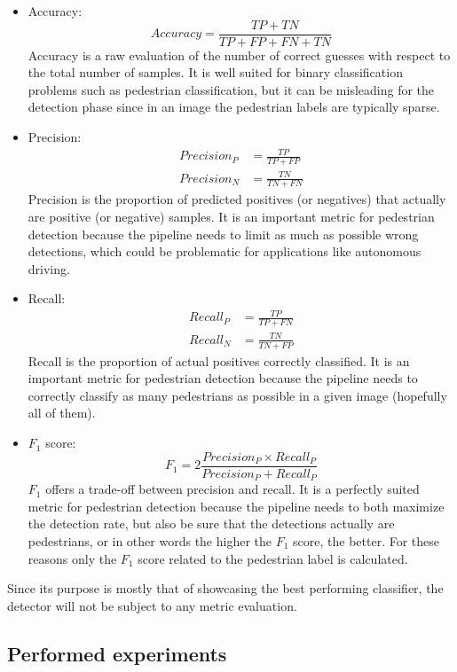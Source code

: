 \documentclass[journal,twocolumn]{IEEEtran}
\begin{document}
\begin{itemize}
\item Accuracy:
\begin{equation*}
Accuracy=\frac{TP+TN}{TP+FP+FN+TN}
\end{equation*}
Accuracy is a raw evaluation of the number of correct guesses with respect to the total number of samples. It is well suited for binary classification problems such as pedestrian classification, but it can be misleading for the detection phase since in an image the pedestrian labels are typically sparse.
\item Precision:
\begin{align*}
Precision_P &= \frac{TP}{TP+FP}\\
Precision_N &= \frac{TN}{TN+FN}
\end{align*}
Precision is the proportion of predicted positives (or negatives) that actually are positive (or negative) samples. It is an important metric for pedestrian detection because the pipeline needs to limit as much as possible wrong detections, which could be problematic for applications like autonomous driving.
\item Recall:
\begin{align*}
Recall_P &= \frac{TP}{TP+FN}\\
Recall_N &= \frac{TN}{TN+FP}
\end{align*}
Recall is the proportion of actual positives correctly classified. It is an important metric for pedestrian detection because the pipeline needs to correctly classify as many pedestrians as possible in a given image (hopefully all of them).
\item $F_1$ score:
\begin{equation*}
F_1=2\frac{Precision_P\times Recall_P}{Precision_P + Recall_P}
\end{equation*}
$F_1$ offers a trade-off between precision and recall. It is a perfectly suited metric for pedestrian detection because the pipeline needs to both maximize the detection rate, but also be sure that the detections actually are pedestrians, or in other words the higher the $F_1$ score, the better. For these reasons only the $F_1$ score related to the pedestrian label is calculated.
\end{itemize}

Since its purpose is mostly that of showcasing the best performing classifier, the detector will not be subject to any metric evaluation.

\subsection{Performed experiments}
\end{document}
